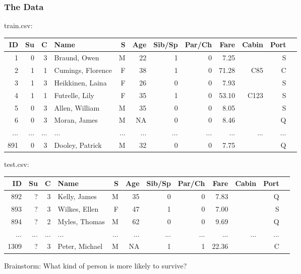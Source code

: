 \documentclass{beamer}
\begin{document}
\begin{frame}
\frametitle{The Data}
train.csv:
\begin{center}
{\tiny
\begin{tabular}{|r|r|r|l|r|r|r|r|r|r|r|r|}\hline
ID	& Su	& C	& Name				& S	& Age	& Sib/Sp	& Par/Ch	& Fare	& Cabin	& Port	\\\hline
1	& 0	& 3	& Braund, Owen		& M	& 22		& 1		& 0		& 7.25	& 		& S		\\\hline
2	& 1	& 1	& Cumings, Florence	& F	& 38		& 1		& 0		& 71.28	& C85	& C		\\\hline
3	& 1	& 3	& Heikkinen, Laina		& F	& 26		& 0		& 0		& 7.93	&		& S		\\\hline
4	& 1	& 1	& Futrelle, Lily			& F	& 35		& 1		& 0		& 53.10	& C123	& S		\\\hline
5	& 0	& 3	& Allen, William		& M	& 35		& 0		& 0		& 8.05	&		& S		\\\hline
6	& 0	& 3	& Moran, James		& M	& NA		& 0		& 0		& 8.46	&		& Q		\\\hline
...	& ...	& ...	& ...					& ...	& ...		& ...		& ...		& ...		& ...		& ...		\\\hline
891	& 0	& 3	& Dooley, Patrick		& M	& 32		& 0		& 0		& 7.75	&		& Q		\\\hline
\end{tabular}
}
\end{center}
test.csv:
\begin{center}
{\tiny
\begin{tabular}{|r|r|r|l|r|r|r|r|r|r|r|r|}\hline
ID	& Su	& C	& Name				& S	& Age	& Sib/Sp	& Par/Ch	& Fare	& Cabin	& Port	\\\hline
892	& ?	& 3	& Kelly, James			& M	& 35		& 0		& 0		& 7.83	& 		& Q		\\\hline
893	& ?	& 3	& Wilkes, Ellen			& F	& 47		& 1		& 0		& 7.00	&		& S		\\\hline
894	& ?	& 2	& Myles, Thomas		& M	& 62		& 0		& 0		& 9.69	&		& Q		\\\hline
...	& ...	& ...	& ...					& ...	& ...		& ...		& ...		& ...		& ...		& ...		\\\hline
1309	& ?	& 3	& Peter, Michael		& M	& NA		& 1		& 1		& 22.36	&		& C		\\\hline
\end{tabular}
}
\end{center}
Brainstorm: What kind of person is more likely to survive?
\end{frame}
\end{document}
